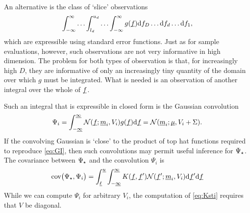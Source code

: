 \documentclass[twoside]{article}
\begin{document}
An alternative is the class of `slice' observations 
\begin{equation}
 \int_{-\infty}^{\infty} \ldots \int_{l_d}^{u_d} \ldots \int_{-\infty}^{\infty} g(\underline{\smash{f}}) \mathrm{d} f_D \ldots \mathrm{d} f_d\ldots \mathrm{d} f_1,
\end{equation}
which are expressible using standard error functions. Just as for sample evaluations, however, such observations are not very informative in high dimension. The problem for both types of observation is that, for increasingly high $D$, they are informative of only an increasingly tiny quantity of the domain over which $g$ must be integrated. What is needed is an observation of another integral over the whole of $\underline{\smash{f}}$.

Such an integral that is expressible in closed form is the Gaussian convolution
 \begin{equation}\label{eq:conv}
 \Psi_i = \int_{-\underline{\smash{\infty}}}^{\underline{\smash{\infty}}} \mathcal{N}(\underline{\smash{f}};\underline{\smash{m}}_i,V_i) g(\underline{\smash{f}}) \mathrm{d} \underline{\smash{f}} = \mathcal{N}(\underline{\smash{m}}_i;\underline{\smash{\mu}},V_i+\Sigma).
\end{equation}
 If the convolving Gaussian is `close' to the product of top hat functions required to reproduce \eqref{eq:GI}, then such convolutions may permit useful inference for $\Psi_\star$. The covariance between $\Psi_\star$ and the convolution $\Psi_i$ is
\begin{align}\label{eq:Ksti}
\text{cov}\bigl(\Psi_\star, \Psi_i\bigr) =
\int_{\underline{\smash{\ell}}}^{\underline{\smash{u}}} \int_{-\underline{\smash{\infty}}}^{\underline{\smash{\infty}}}  K(\underline{\smash{f}}, \underline{\smash{f}}') \mathcal{N}(\underline{\smash{f}}';\underline{\smash{m}}_i,V_i) \mathrm{d} \underline{\smash{f}}' \mathrm{d} \underline{\smash{f}} 
\end{align}
While we can compute $\Psi_i$ for arbitrary $V_i$, the computation of \eqref{eq:Ksti} requires that $V$ be diagonal. 








\end{document}
